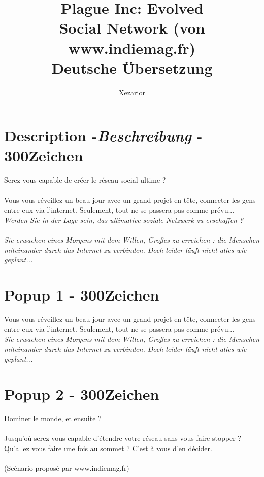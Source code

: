 \documentclass[10pt,a4paper]{article}
\author{Xezarior}
\title{Plague Inc: Evolved \\ \textbf{Social Network (von www.indiemag.fr)}\\ Deutsche Übersetzung}
\begin{document}
\maketitle


\section{Description -\emph{Beschreibung} - 300Zeichen}

Serez-vous capable de créer le réseau social ultime ?\\
\\
Vous vous réveillez un beau jour avec un grand projet en tête, connecter les gens entre eux via l'internet. Seulement, tout ne se passera pas comme prévu...\\

\textit{Werden Sie in der Lage sein, das ultimative soziale Netzwerk zu erschaffen ? \\
\\
Sie erwachen eines Morgens mit dem Willen, Gro\ss es zu erreichen : die Menschen miteinander durch das Internet zu verbinden. Doch leider läuft nicht alles wie geplant...}



\section{Popup 1 - 300Zeichen}

Vous vous réveillez un beau jour avec un grand projet en tête, connecter les gens entre eux via l'internet. Seulement, tout ne se passera pas comme prévu...\\

\textit{Sie erwachen eines Morgens mit dem Willen, Gro\ss es zu erreichen : die Menschen miteinander durch das Internet zu verbinden. Doch leider läuft nicht alles wie geplant...}


\section{Popup 2 - 300Zeichen}

Dominer le monde, et ensuite ?\\
\\
Jusqu'où serez-vous capable d'étendre votre réseau sans vous faire stopper ? Qu'allez vous faire une fois au sommet ? C'est à vous d'en décider.\\
\\
(Scénario proposé par www.indiemag.fr)\\
\end{document}
